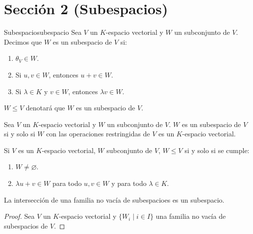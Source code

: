 \section{Sección 2 (Subespacios)}
\begin{definition}{Subespacio}{subespacio} 
    Sea $V$ un $K$-espacio vectorial y $W$ un subconjunto de $V$. Decimos que $W$ es un subespacio de $V$ si:
    \begin{enumerate}[label=\alph*)]
        \item $\theta_V \in W$.
        \item Si $u,v\in W$, entonces $u+v\in W$.
        \item Si $\lambda \in K$ y $v\in W$, entonces $\lambda v \in W$.
    \end{enumerate}
\end{definition}
\begin{notation}{}{}
    $W \leq V$ denotará que $W$ es un subespacio de $V$.
\end{notation}
\begin{proposition}{}{}
    Sea $V$ un $K$-espacio vectorial y $W$ un subconjunto de $V$. $W$ es un subespacio de $V$ si y solo si $W$ con las operaciones restringidas de $V$ es un $K$-espacio vectorial.
\end{proposition}
\begin{obs}{}{}
    Si $V$ es un $K$-espacio vectorial, $W$ subconjunto de $V$, $W \leq V$ si y solo si se cumple:
    \begin{enumerate}
        \item $W \neq \varnothing$.
        \item $\lambda u + v \in W$ para todo $u,v \in W$ y para todo $\lambda \in K$.
    \end{enumerate}
\end{obs}
\begin{proposition}
    La intersección de una familia no vacía de subespacioes es un subespacio.
\end{proposition}

\begin{proof}
    Sea $V$ un $K$-espacio vectorial y $\{W_i \mid i \in I\}$ una familia no vacía de subespacios de $V$.
\end{proof}


